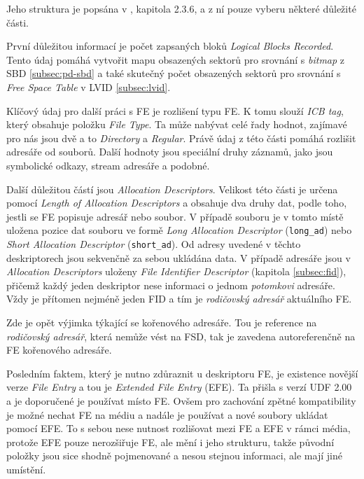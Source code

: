 Jeho struktura je popsána v \cite{osta-udf-0201}, kapitola 2.3.6, a z ní pouze vyberu některé důležité části.

První důležitou informací je počet zapsaných bloků \textit{Logical Blocks Recorded}. Tento údaj pomáhá vytvořit mapu obsazených sektorů pro srovnání s \textit{bitmap} z SBD \ref{subsec:pd-sbd} a také skutečný počet obsazených sektorů pro srovnání s \textit{Free Space Table} v LVID \ref{subsec:lvid}.

Klíčový údaj pro další práci s FE je rozlišení typu FE. K tomu slouží \textit{ICB tag}, který obsahuje položku \textit{File Type}. Ta může nabývat celé řady hodnot, zajímavé pro nás jsou dvě a to \textit{Directory} a \textit{Regular}. Právě údaj z této části pomáhá rozlišit adresáře od souborů. Další hodnoty jsou speciální druhy záznamů, jako jsou symbolické odkazy, stream adresáře a podobné.
 
Další důležitou částí jsou \textit{Allocation Descriptors}. Velikost této části je určena pomocí \textit{Length of Allocation Descriptors} a obsahuje dva druhy dat, podle toho, jestli se FE popisuje adresář nebo soubor. V případě souboru je v tomto místě uložena pozice dat souboru ve formě \textit{Long Allocation Descriptor} (\texttt{long\_ad}) nebo \textit{Short Allocation Descriptor} (\texttt{short\_ad}). Od adresy uvedené v těchto deskriptorech jsou sekvenčně za sebou ukládána data. V případě adresáře jsou v \textit{Allocation Descriptors} uloženy \textit{File Identifier Descriptor} (kapitola \ref{subsec:fid}), přičemž každý jeden deskriptor nese informaci o jednom \textit{potomkovi} adresáře. Vždy je přítomen nejméně jeden FID a tím je \textit{rodičovský adresář} aktuálního FE.

Zde je opět výjimka týkající se kořenového adresáře. Tou je reference na \textit{rodičovský adresář}, která nemůže vést na FSD, tak je zavedena autoreferenčně na FE kořenového adresáře.

Posledním faktem, který je nutno zdůraznit u deskriptoru FE, je existence novější verze \textit{File Entry} a tou je \textit{Extended File Entry} (EFE). Ta přišla s verzí UDF 2.00 a je doporučené je používat místo FE. Ovšem pro zachování zpětné kompatibility je možné nechat FE na médiu a nadále je používat a nové soubory ukládat pomocí EFE. To s sebou nese nutnost rozlišovat mezi FE a EFE v rámci média, protože EFE pouze nerozšiřuje FE, ale mění i jeho strukturu, takže původní položky jsou sice shodně pojmenované a nesou stejnou informaci, ale mají jiné umístění. 

